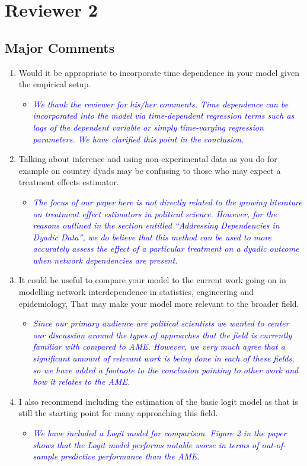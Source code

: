 \section{Reviewer 2}

\subsection{Major Comments}

\begin{enumerate}
	\item Would it be appropriate to incorporate time dependence in your model given the empirical setup.
	\begin{itemize}
		\item \textcolor{blue}{ \emph{
		We thank the reviewer for his/her comments. Time dependence can be incorporated into the model via time-dependent regression terms such as lags of the dependent variable or simply time-varying regression parameters. We have clarified this point in the conclusion.
		}}
	\end{itemize}
	\item Talking about inference and using non-experimental data as you do for example on country dyads may be confusing to those who may expect a treatment effects estimator.
	\begin{itemize}
		\item \textcolor{blue}{ \emph{
		The focus of our paper here is not directly related to the growing literature on treatment effect estimators in political science. However, for the reasons outlined in the section entitled ``Addressing Dependencies in Dyadic Data'', we do believe that this method can be used to more accurately assess the effect of a particular treatment on a dyadic outcome when network dependencies are present. 
		}}
	\end{itemize}	
	\item It could be useful to compare your model to the current work going on in modelling network interdependence in statistics, engineering and epidemiology, That may make your model more relevant to the broader field.
	\begin{itemize}
		\item \textcolor{blue}{ \emph{
		Since our primary audience are political scientists we wanted to center our discussion around the types of approaches that the field is currently familiar with compared to AME. However, we very much agree that a significant amount of relevant work is being done in each of these fields, so we have added a footnote to the conclusion pointing to other work and how it relates to the AME.
		}}
	\end{itemize}	
	\item I also recommend including the estimation of the basic logit model as that is still the starting point for many approaching this field.
	\begin{itemize}
		\item \textcolor{blue}{ \emph{
		We have included a Logit model for comparison. Figure 2 in the paper shows that the Logit model performs notable worse in terms of out-of-sample predictive performance than the AME.
		}}
	\end{itemize}	
\end{enumerate}